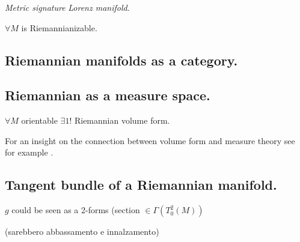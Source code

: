 \documentclass[a4paper,12pt]{scrartcl}    %
\begin{document}
\begin{notationfix}
 \emph{Metric signature} \emph{Lorenz manifold}.
\end{notationfix}

\begin{theorem}
$\forall M$ is Riemannianizable.
\end{theorem}

\subsection{Riemannian manifolds as a category.}
\begin{definition}
\end{definition}

\begin{definition}[Isometry]
\end{definition}

\begin{definition}
\end{definition}

\subsection{Riemannian as a measure space.}
\begin{definition}
\end{definition}

\begin{theorem}
$\forall M$ orientable $\exists1!$ Riemannian volume form.
\end{theorem}

\begin{observation}
For an insight on the connection between volume form and measure theory see for example \cite{Abraham1978}.
\end{observation}

\subsection{Tangent bundle of a Riemannian manifold.}
\begin{observation}
$g$ could be seen as a 2-forms (section $\in \Gamma(T^2_0(M))$
\end{observation}

\begin{definition}
	(sarebbero abbassamento e innalzamento)
\end{definition}
\end{document}
